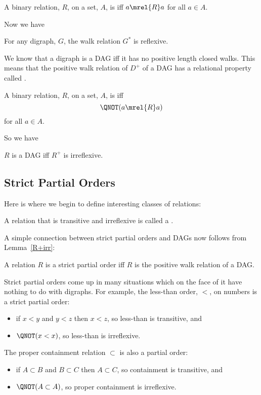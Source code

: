 \begin{definition}
A binary relation, $R$, on a set, $A$, is  iff $a
\mrel{R} a$ for all $a \in A$.
\end{definition}
Now we have
\begin{lemma}
For any digraph, $G$, the walk relation $G^*$ is reflexive.
\end{lemma}

We know that a digraph is a DAG iff it has no positive length closed
walks. \iffalse Lemma~\ref{shortestclosedwalk_lem} \fi This means that
the positive walk relation of $D^+$ of a DAG has a relational property
called .

\begin{definition}
A binary relation, $R$, on a set, $A$, is
 iff
\[
\QNOT(a \mrel{R} a)
\]
for all $a \in A$.
\end{definition}
So we have
\begin{lemma}\label{R+irr}
$R$ is a DAG iff $R^+$ is irreflexive.
\end{lemma}

\subsection{Strict Partial Orders}

Here is where we begin to define interesting classes of relations:

\begin{definition}
A relation that is transitive and irreflexive is called a .
\end{definition}

A simple connection between strict partial orders and DAGs now follows from Lemma~\ref{R+irr}:
\begin{theorem}\label{thm:SPOiffDAG}
A relation $R$ is a strict partial order iff $R$ is the positive walk
relation of a DAG.
\end{theorem}

Strict partial orders come up in many situations which on the face of
it have nothing to do with digraphs.  For example, the less-than
order, $<$, on numbers is a strict partial order:
\begin{itemize}
\item if $x <y$ and $y < z$ then $x < z$, so less-than is transitive, and
\item  $\QNOT(x < x)$, so less-than is irreflexive.
\end{itemize}
The proper containment relation $\subset$ is also a
partial order:
\begin{itemize}
\item if $A \subset B$ and $B \subset C$ then $A \subset C$,
so containment is transitive, and
\item  $\QNOT(A \subset A)$, so proper containment is irreflexive.
\end{itemize}

